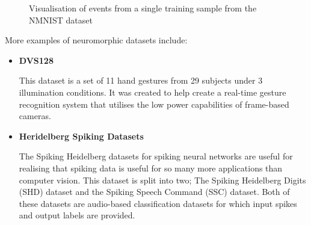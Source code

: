 \begin{figure}[htb]%
      \centering
      \qquad
      \caption{Visualisation of events from a single training sample from the NMNIST dataset}%
      \label{fig:nmnist_spikes_visualisation}%
\end{figure}

More examples of neuromorphic datasets include:

\begin{itemize}
      \item \textbf{DVS128}

            This dataset is a set of 11 hand gestures from 29 subjects under 3 illumination conditions. It was created to help create a real-time gesture recognition system that utilises the low power capabilities of frame-based cameras\cite{DVS128}.
      \item \textbf{Heridelberg Spiking Datasets}

            The Spiking Heidelberg datasets for spiking neural networks\cite{SpikingHeidelberg} are useful for realising that spiking data is useful for so many more applications than computer vision. This dataset is split into two; The Spiking Heidelberg Digits (SHD) dataset and the Spiking Speech Command (SSC) dataset. Both of these datasets are audio-based classification datasets for which input spikes and output labels are provided.
\end{itemize}

